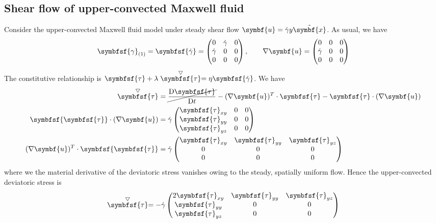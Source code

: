 \documentclass{jknotes}
\begin{document}
\subsection{Shear flow of upper-convected Maxwell fluid}
\label{ss:ucmshear}
Consider the upper-convected Maxwell fluid model under steady shear flow
$\symbf{u} = \srate y \hat{\symbf{x}}$. As usual, we have
\begin{equation}
	\symbfsf{\gamma}_{(1)} = \symbfsf{\srate} = \begin{pmatrix} 0 & \srate & 0 \\
	\srate & 0 & 0 \\ 0 & 0 & 0 \end{pmatrix}, \hspace{2em} \nabla \symbf{u} =
\begin{pmatrix} 0 & 0 & 0 \\ \srate & 0 & 0 \\ 0 & 0 & 0 \end{pmatrix}
\end{equation}
The constitutive relationship is $\symbfsf{\tau} + \lambda
\stackrel{\bigtriangledown}{\symbfsf{\tau}} = \eta \symbfsf{\srate}$. We have
\begin{align}
	\stackrel{\bigtriangledown}{\symbfsf{\tau}} &= \cancel{\frac{\diffD
	\symbfsf{\tau}}{\diffD t}} - (\nabla \symbf{u})^T \cdot \symbfsf{\tau} -
	\symbfsf{\tau}\cdot(\nabla \symbf{u}) \\
	\symbfsf{\symbfsf{\tau}}\cdot(\nabla \symbf{u}) &= \srate 
	\begin{pmatrix} \symbfsf{\tau}_{xy} & 0 & 0 \\ \symbfsf{\tau}_{yy} & 0 & 0 \\
	\symbfsf{\tau}_{yz} & 0 & 0 \end{pmatrix} \\
	(\nabla \symbf{u})^T\cdot\symbfsf{\symbfsf{\tau}} &= \srate 
	\begin{pmatrix} \symbfsf{\tau}_{xy} &  \symbfsf{\tau}_{yy} & 
	\symbfsf{\tau}_{yz}\\0 & 0 & 0\\0&0&0 \end{pmatrix} \\
\end{align}
where we the material derivative of the deviatoric stress vanishes owing to
the steady, spatially uniform flow.
Hence the upper-convected deviatoric stress is
\begin{equation}
	\stackrel{\bigtriangledown}{\symbfsf{\tau}} = -\srate \begin{pmatrix} 2
		\symbfsf{\tau}_{xy} & \symbfsf{\tau}_{yy} & \symbfsf{\tau}_{yz} \\
		\symbfsf{\tau}_{yy} & 0 & 0 \\ \symbfsf{\tau}_{yz} & 0 & 0
	\end{pmatrix}
\end{equation}
\end{document}
